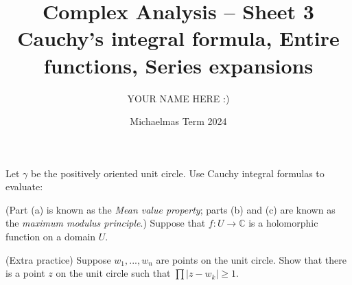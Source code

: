 \documentclass[answers]{exam}
\title{Complex Analysis -- Sheet 3\\Cauchy's integral formula, Entire functions, Series expansions}
\author{YOUR NAME HERE :)}
\date{Michaelmas Term 2024}
\begin{document}
\maketitle
\begin{questions}

\question%
Let $\gamma$ be the positively oriented unit circle. Use Cauchy integral formulas to evaluate:



\question%
(Part (a) is known as the \emph{Mean value property}; parts (b) and (c) are known as the \emph{maximum modulus principle}.) Suppose that $f: U \to \mathbb{C}$ is a holomorphic function on a domain $U$.



\question%
(Extra practice) Suppose $w_1,...,w_n$ are points on the unit circle. Show that there is a point $z$ on the unit circle such that $\prod|z-w_k|\geqslant1$.




\end{questions}
\end{document}
